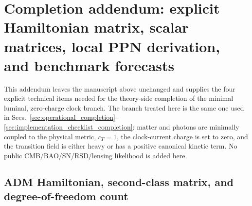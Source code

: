 \documentclass[aps,prd,reprint,nofootinbib,superscriptaddress,longbibliography]{revtex4-2}
\begin{document}
\clearpage
\onecolumngrid
\section{Completion addendum: explicit Hamiltonian matrix, scalar matrices, local PPN derivation, and benchmark forecasts}
\label{app:completion_addendum}

This addendum leaves the manuscript above unchanged and supplies the four explicit technical items needed for the theory-side completion of the minimal luminal, zero-charge clock branch. The branch treated here is the same one used in Secs.~\ref{sec:operational_completion}--\ref{sec:implementation_checklist_completion}: matter and photons are minimally coupled to the physical metric, $c_T=1$, the clock-current charge is set to zero, and the transition field is either heavy or has a positive canonical kinetic term. No public CMB/BAO/SN/RSD/lensing likelihood is added here.

\subsection{ADM Hamiltonian, second-class matrix, and degree-of-freedom count}
\label{app:explicit_hamiltonian_matrix}
\end{document}
